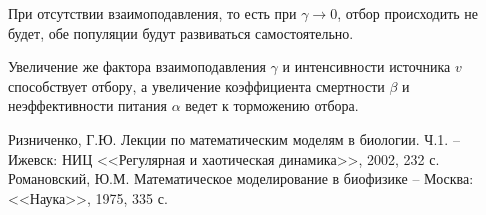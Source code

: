При отсутствии взаимоподавления, то есть при \( \gamma \to 0 \), отбор
происходить не будет, обе популяции будут развиваться самостоятельно.

Увеличение же фактора взаимоподавления \( \gamma \) и интенсивности
источника \( v \) способствует отбору, а увеличение коэффициента смертности
\( \beta \) и неэффективности питания \( \alpha \) ведет к торможению отбора.

\vspace*{2em} %
\renewcommand{\bibname}{Список литературы}

\begin{thebibliography}{9} 
     Ризниченко, Г.Ю. Лекции по математическим моделям в 
            биологии. Ч.1. -- Ижевск: НИЦ
            <<Регулярная и хаотическая динамика>>, 2002, 232 с.
     Романовский, Ю.М. Математическое моделирование в биофизике
            -- Москва: <<Наука>>, 1975, 335 с.
\end{thebibliography}